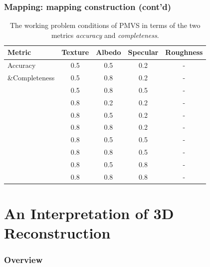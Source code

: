 \documentclass{beamer}
\begin{document}
\begin{frame}
\frametitle{Mapping: mapping construction (cont'd)}

\begin{table}[!htbp]
  \centering
  \begin{tabular}{l*{4}{c}}
  \toprule
  \textbf{Metric} & Texture & Albedo & Specular & Roughness\\
  \midrule
  Accuracy & 0.5 & 0.5 & 0.2 & -\\
  \&Completeness & 0.5 & 0.8 & 0.2 & -\\
           & 0.5 & 0.8 & 0.5 & -\\
           & 0.8 & 0.2 & 0.2 & -\\
           & 0.8 & 0.5 & 0.2 & -\\
           & 0.8 & 0.8 & 0.2 & -\\
           & 0.8 & 0.5 & 0.5 & -\\
           & 0.8 & 0.8 & 0.5 & -\\
           & 0.8 & 0.5 & 0.8 & -\\
           & 0.8 & 0.8 & 0.8 & -\\
  \bottomrule
  \end{tabular}
  \caption{The working problem conditions of PMVS in terms of the two metrics \textit{accuracy} and \textit{completeness}.}
  \label{tab:mvs_training_result}
\end{table}

\end{frame}

\section{An Interpretation of 3D Reconstruction} %

\begin{frame}
\frametitle{Overview} %
\tableofcontents[currentsection,currentsubsection, 
    hideothersubsections, 
    sectionstyle=show/shaded,] %
\end{frame}
\end{document}
